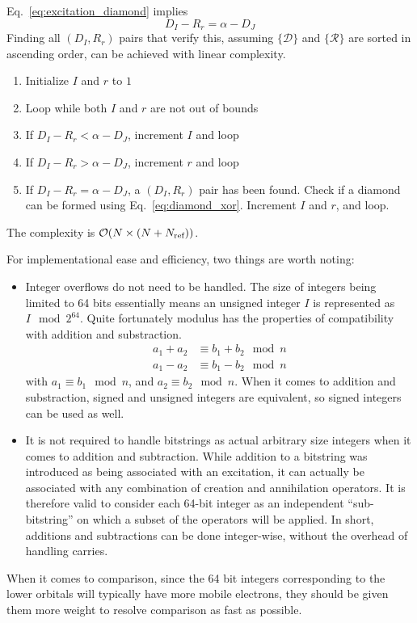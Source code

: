 \documentclass[./thesis.tex]{subfiles}
\begin{document}
Eq.~\eqref{eq:excitation_diamond} implies
\begin{equation}
D_I - R_r = \alpha - D_J 
\end{equation}
Finding all $(D_I, R_r)$ pairs that verify this, assuming $\{\mathcal{D}\}$ and $\{\mathcal{R}\}$ are sorted in ascending order, can be achieved with linear complexity.


\begin{enumerate}
\item
Initialize $I$ and $r$ to $1$
\item
Loop while both $I$ and $r$ are not out of bounds
\item
If $D_I - R_r < \alpha - D_J$, increment $I$ and loop
\item
If $D_I - R_r > \alpha - D_J$, increment $r$ and loop
\item
If $D_I - R_r = \alpha - D_J$, a $(D_I, R_r)$ pair has been found. Check if a diamond can be formed using Eq.~\eqref{eq:diamond_xor}. Increment $I$ and $r$, and loop.
\end{enumerate}
The complexity is $\mathcal{O}(N \times (N+{N_\text{ref}}))$.

For implementational ease and efficiency, two things are worth noting:
\begin{itemize}

\item
Integer overflows do not need to be handled. The size of integers being limited to 64 bits essentially means an unsigned integer $I$ is represented as $I \mod{2^{64}}$. Quite fortunately modulus has the properties of compatibility with addition and substraction.
\begin{align}
a_1 + a_2 &\equiv b_1 + b_2 \mod{n} \\
a_1 - a_2 &\equiv b_1 - b_2 \mod{n}
\end{align}
with $a_1 \equiv b_1 \mod n$, and $a_2 \equiv b_2 \mod n$. When it comes to addition and substraction, signed and unsigned integers are equivalent, so signed integers can be used as well.
\item
It is not required to handle bitstrings as actual arbitrary size integers when it comes to addition and subtraction. While addition to a bitstring was introduced as being associated with an excitation, it can actually be associated with any combination of creation and annihilation operators. It is therefore valid to consider each 64-bit integer as an independent ``sub-bitstring'' on which a subset of the operators will be applied. In short, additions and subtractions can be done integer-wise, without the overhead of handling carries.
\end{itemize}
When it comes to comparison, since the 64 bit integers corresponding to the lower orbitals will typically have more mobile electrons, they should be given them more weight to resolve comparison as fast as possible.
\end{document}
